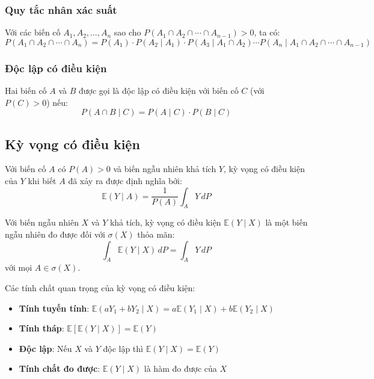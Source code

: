 \subsubsection*{Quy tắc nhân xác suất}
\begin{dl}
Với các biến cố $A_1, A_2, \ldots, A_n$ sao cho $P(A_1 \cap A_2 \cap \cdots \cap A_{n-1}) > 0$, ta có:
\[
P(A_1 \cap A_2 \cap \cdots \cap A_n) = P(A_1) \cdot P(A_2 \mid A_1) \cdot P(A_3 \mid A_1 \cap A_2) \cdots P(A_n \mid A_1 \cap A_2 \cap \cdots \cap A_{n-1})
\]
\end{dl}

\subsubsection*{Độc lập có điều kiện}
\begin{dn}
Hai biến cố $A$ và $B$ được gọi là độc lập có điều kiện với biến cố $C$ (với $P(C) > 0$) nếu:
\[
P(A \cap B \mid C) = P(A \mid C) \cdot P(B \mid C)
\]
\end{dn}

\subsection{Kỳ vọng có điều kiện}
\begin{dn}
Với biến cố $A$ có $P(A)>0$ và biến ngẫu nhiên khả tích $Y$, kỳ vọng có điều kiện của $Y$ khi biết $A$ đã xảy ra được định nghĩa bởi:
\[
\mathbb{E}(Y\mid A)=\frac{1}{P(A)}\int_A Y\,dP
\]
\end{dn}

\begin{dn}
Với biến ngẫu nhiên $X$ và $Y$ khả tích, kỳ vọng có điều kiện $\mathbb{E}(Y \mid X)$ là một biến ngẫu nhiên đo được đối với $\sigma(X)$ thỏa mãn:
\[
\int_A \mathbb{E}(Y \mid X) \, dP = \int_A Y \, dP
\]
với mọi $A \in \sigma(X)$.
\end{dn}

\begin{tinhchat}
Các tính chất quan trọng của kỳ vọng có điều kiện:
\begin{itemize}
    \item \textbf{Tính tuyến tính}: $\mathbb{E}(aY_1 + bY_2 \mid X) = a\mathbb{E}(Y_1 \mid X) + b\mathbb{E}(Y_2 \mid X)$
    \item \textbf{Tính tháp}: $\mathbb{E}[\mathbb{E}(Y \mid X)] = \mathbb{E}(Y)$
    \item \textbf{Độc lập}: Nếu $X$ và $Y$ độc lập thì $\mathbb{E}(Y \mid X) = \mathbb{E}(Y)$
    \item \textbf{Tính chất đo được}: $\mathbb{E}(Y \mid X)$ là hàm đo được của $X$
\end{itemize}
\end{tinhchat}

